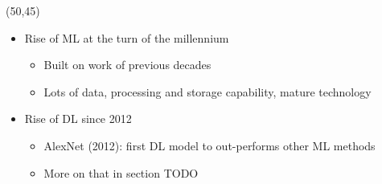 \begin{frame}
  \begin{textblock}{45}(50,45)
    \begin{itemize}
    \item<7-> Rise of \ac{ML} at the turn of the millennium
      \begin{itemize}
      \item Built on work of previous decades
      \item Lots of data, processing and storage capability, mature technology
      \end{itemize}
    \item<8-> Rise of \acl{DL} since 2012
      \begin{itemize}
      \item AlexNet (2012): first \ac{DL} model to out-performs other \ac{ML}
        methods
      \item More on that in section TODO
      \end{itemize}
    \end{itemize}
  \end{textblock}
\end{frame}


